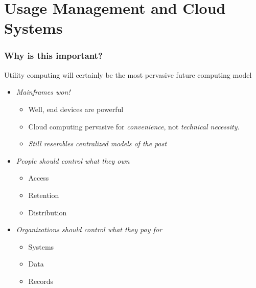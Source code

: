 \documentclass[t, 10pt]{beamer}
\begin{document}
\section{Usage Management and Cloud Systems}
\begin{frame}
\frametitle{Why is this important?}
Utility computing will certainly be the most pervasive future computing model \\
\begin{itemize}
\item \textit{Mainframes won!}
\begin{itemize}
\item Well, end devices are powerful
\item Cloud computing pervasive for \textit{convenience}, not \textit{technical necessity}.
\item \textit{Still resembles centralized models of the past}
\end{itemize}
\item \textit{People should control what they own}
\begin{itemize}
\item Access
\item Retention
\item Distribution
\end{itemize}
\item \textit{Organizations should control what they pay for}
\begin{itemize}
\item Systems
\item Data
\item Records
\end{itemize}
\end{itemize}
\end{frame}
\end{document}
